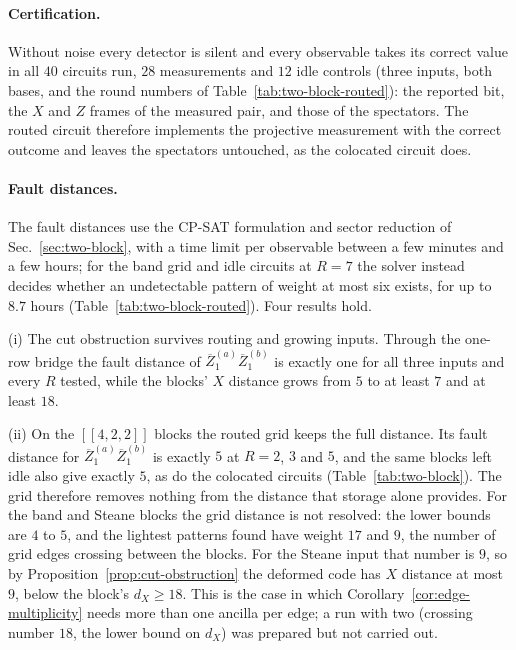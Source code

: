 \documentclass[aps,prx,reprint,superscriptaddress,nofootinbib,floatfix,longbibliography]{revtex4-2}
\theoremstyle{definition}
\begin{document}
\paragraph{Certification.}
Without noise every detector is silent and every observable takes its
correct value in all $40$ circuits run, $28$ measurements and $12$ idle
controls (three inputs, both bases, and the round numbers of
Table~\ref{tab:two-block-routed}): the reported bit, the $X$ and $Z$ frames of
the measured pair, and those of the spectators.  The routed circuit therefore
implements the projective measurement with the correct outcome and leaves the
spectators untouched, as the colocated circuit does.

\paragraph{Fault distances.}
The fault distances use the CP-SAT formulation and sector reduction of
Sec.~\ref{sec:two-block}, with a time limit per observable between a few
minutes and a few hours; for the band grid and idle circuits at $R=7$ the solver instead
decides whether an undetectable pattern of weight at most six exists, for up
to $8.7$ hours (Table~\ref{tab:two-block-routed}).  Four results hold.

(i) The cut obstruction survives routing and growing inputs.  Through the
one-row bridge the fault distance of $\overline Z_1^{(a)}\overline Z_1^{(b)}$
is exactly one for all three inputs and every $R$ tested, while the blocks'
$X$ distance grows from $5$ to at least $7$ and at least $18$.

(ii) On the $[[4,2,2]]$ blocks the routed grid keeps the full distance.  Its
fault distance for $\overline Z_1^{(a)}\overline Z_1^{(b)}$ is exactly $5$ at
$R=2$, $3$ and $5$, and the same blocks left idle also give exactly $5$, as do
the colocated circuits (Table~\ref{tab:two-block}).  The grid therefore
removes nothing from the distance that storage alone provides.  For the band
and Steane blocks the grid distance is not resolved: the lower bounds are $4$
to $5$, and the lightest patterns found have weight $17$ and $9$, the number
of grid edges crossing between the blocks.  For the Steane input that number
is $9$, so by Proposition~\ref{prop:cut-obstruction} the deformed code has
$X$ distance at most $9$, below the block's $d_X\ge18$.  This is the case in
which Corollary~\ref{cor:edge-multiplicity} needs more than one ancilla per
edge; a run with two (crossing number $18$, the lower bound on $d_X$) was
prepared but not carried out.
\end{document}

